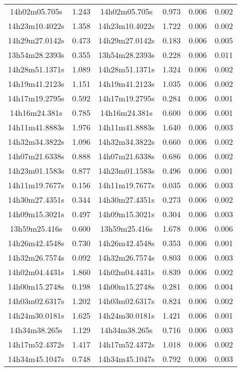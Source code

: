 \begin{table}
\begin{tabular}{cccccc}
14h02m05.705s & 1.243 & 14h02m05.705s & 0.973 & 0.006 & 0.002 \\
14h23m10.4022s & 1.358 & 14h23m10.4022s & 1.722 & 0.006 & 0.002 \\
14h29m27.0142s & 0.473 & 14h29m27.0142s & 0.183 & 0.006 & 0.005 \\
13h54m28.2393s & 0.355 & 13h54m28.2393s & 0.228 & 0.006 & 0.011 \\
14h28m51.1371s & 1.089 & 14h28m51.1371s & 1.324 & 0.006 & 0.002 \\
14h19m41.2123s & 1.151 & 14h19m41.2123s & 1.035 & 0.006 & 0.002 \\
14h17m19.2795s & 0.592 & 14h17m19.2795s & 0.284 & 0.006 & 0.001 \\
14h16m24.381s & 0.785 & 14h16m24.381s & 0.600 & 0.006 & 0.001 \\
14h11m41.8883s & 1.976 & 14h11m41.8883s & 1.640 & 0.006 & 0.003 \\
14h32m34.3822s & 1.096 & 14h32m34.3822s & 0.660 & 0.006 & 0.002 \\
14h07m21.6338s & 0.888 & 14h07m21.6338s & 0.686 & 0.006 & 0.002 \\
14h23m01.1583s & 0.877 & 14h23m01.1583s & 0.496 & 0.006 & 0.001 \\
14h11m19.7677s & 0.156 & 14h11m19.7677s & 0.035 & 0.006 & 0.003 \\
14h30m27.4351s & 0.344 & 14h30m27.4351s & 0.273 & 0.006 & 0.002 \\
14h09m15.3021s & 0.497 & 14h09m15.3021s & 0.304 & 0.006 & 0.003 \\
13h59m25.416s & 0.600 & 13h59m25.416s & 1.678 & 0.006 & 0.006 \\
14h26m42.4548s & 0.730 & 14h26m42.4548s & 0.353 & 0.006 & 0.001 \\
14h32m26.7574s & 0.092 & 14h32m26.7574s & 0.803 & 0.006 & 0.003 \\
14h02m04.4431s & 1.860 & 14h02m04.4431s & 0.839 & 0.006 & 0.002 \\
14h00m15.2748s & 0.198 & 14h00m15.2748s & 0.281 & 0.006 & 0.004 \\
14h03m02.6317s & 1.202 & 14h03m02.6317s & 0.824 & 0.006 & 0.002 \\
14h24m30.0181s & 1.625 & 14h24m30.0181s & 1.421 & 0.006 & 0.001 \\
14h34m38.265s & 1.129 & 14h34m38.265s & 0.716 & 0.006 & 0.003 \\
14h17m52.4372s & 1.417 & 14h17m52.4372s & 1.018 & 0.006 & 0.002 \\
14h34m45.1047s & 0.748 & 14h34m45.1047s & 0.792 & 0.006 & 0.003 \\

\end{tabular}
\end{table}
